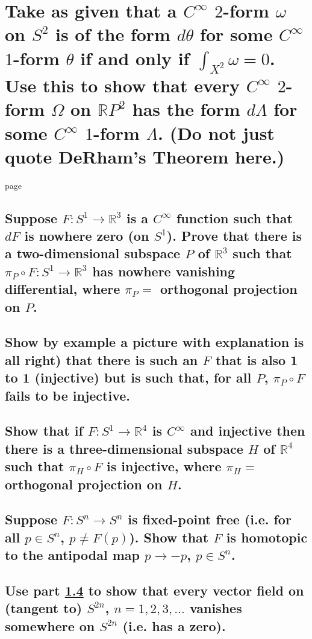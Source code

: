 \documentclass[10pt]{article}
\newcommand{\advsection}{\addtocounter{section}{1} \setcounter{subsection}{0}}
\begin{document}
\section{Take as given that a $C^\infty$ $2$-form $\omega$ on $S^2$ is of the form $d \theta$ for
  some $C^\infty$ $1$-form $\theta$ if and only if $\int_{X^2} \omega =0$. Use this to show that
  every $C^\infty$ $2$-form $\Omega$ on $\mathbb{R} P^2$ has the form $d \Lambda $ for some
  $C^\infty$ $1$-form $\Lambda$. (Do not just quote DeRham's Theorem here.)}

page

\advsection{}

\subsection{Suppose $F: S^1 \to \mathbb{R}^3$ is a $C^\infty$ function such that $dF$ is nowhere
  zero (on $S^1$). Prove that there is a two-dimensional subspace $P$ of $\mathbb{R} ^3$ such that
  $\pi_P \circ F : S^1 \to \mathbb{R}^3$ has nowhere vanishing differential, where $\pi_P =$
  orthogonal projection on $P$.}

\subsection{Show by example a picture with explanation is all right) that there is such an
  $F$ that is also 1 to 1 (injective) but is such that, for all $P$, $\pi_P \circ F$ fails to be
  injective.}

\subsection{Show that if $F: S^1 \to \mathbb{R}^4$ is $C^\infty$ and injective then there is a
  three-dimensional subspace $H$ of $\mathbb{R} ^4$ such that $\pi_H \circ F $ is injective, where
  $\pi_H =$ orthogonal projection on $H$.}

\advsection{}

\subsection{Suppose $F:S^n \to S^n$ is fixed-point free (i.e. for all $ p \in S^n$, $p \neq
  F(p)$). Show that $F$ is homotopic to the antipodal map $p \to -p$, $p \in S^n$.}
\label{antip}

\subsection{Use part \ref{antip} to show that every vector field on (tangent to) $S^{2n}$,
  $n=1,2,3,\dots$ vanishes somewhere on $S^{2n}$ (i.e. has a zero).}
\end{document}
